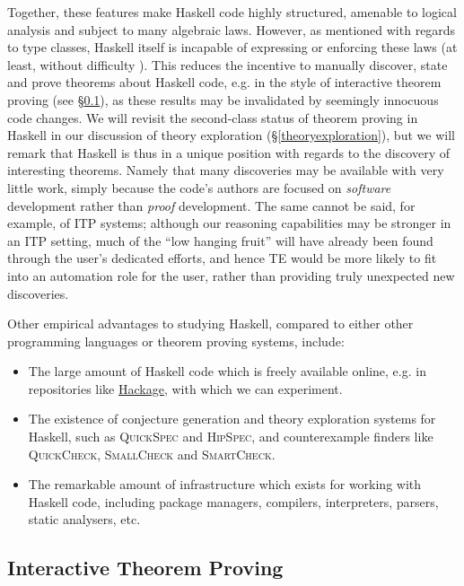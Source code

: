 \documentclass[]{article}
\begin{document}
Together, these features make Haskell code highly structured, amenable to logical analysis and subject to many algebraic laws. However, as mentioned with regards to type classes, Haskell itself is incapable of expressing or enforcing these laws (at least, without difficulty \cite{lindley2014hasochism}). This reduces the incentive to manually discover, state and prove theorems about Haskell code, e.g. in the style of interactive theorem proving (see \S \ref{itp}), as these results may be invalidated by seemingly innocuous code changes. We will revisit the second-class status of theorem proving in Haskell in our discussion of theory exploration (\S \ref{theoryexploration}), but we will remark that Haskell is thus in a unique position with regards to the discovery of interesting theorems. Namely that many discoveries may be available with very little work, simply because the code's authors are focused on \emph{software} development rather than \emph{proof} development. The same cannot be said, for example, of ITP systems; although our reasoning capabilities may be stronger in an ITP setting, much of the ``low hanging fruit'' will have already been found through the user's dedicated efforts, and hence TE would be more likely to fit into an automation role for the user, rather than providing truly unexpected new discoveries.

Other empirical advantages to studying Haskell, compared to either other programming languages or theorem proving systems, include:

\begin{itemize}

\item The large amount of Haskell code which is freely available online, e.g. in repositories like \href{http://hackage.haskell.org}{Hackage}, with which we can experiment.

\item The existence of conjecture generation and theory exploration systems for Haskell, such as \textsc{QuickSpec} and \textsc{HipSpec}, and counterexample finders like \textsc{QuickCheck}, \textsc{SmallCheck} and \textsc{SmartCheck}.

\item The remarkable amount of infrastructure which exists for working with Haskell code, including package managers, compilers, interpreters, parsers, static analysers, etc.

\end{itemize}

\subsection{Interactive Theorem Proving}
\label{itp}
\end{document}
